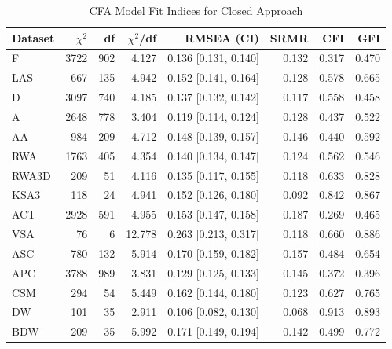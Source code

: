 \begin{table}[t]
\centering
\small
\caption{CFA Model Fit Indices for Closed Approach}
\label{tab:cfa-closed}
\begin{tabular}{lrrrrrrr}
\toprule
Dataset & $\chi^2$ & df & $\chi^2$/df & RMSEA (CI) & SRMR & CFI & GFI \\
\midrule
\rowcolor{Gray}F & 3722 & 902 & 4.127 & 0.136 [0.131, 0.140] & 0.132 & 0.317 & 0.470 \\
LAS & 667 & 135 & 4.942 & 0.152 [0.141, 0.164] & 0.128 & 0.578 & 0.665 \\
\rowcolor{Gray}D & 3097 & 740 & 4.185 & 0.137 [0.132, 0.142] & 0.117 & 0.558 & 0.458 \\
A & 2648 & 778 & 3.404 & 0.119 [0.114, 0.124] & 0.128 & 0.437 & 0.522 \\
\rowcolor{Gray}AA & 984 & 209 & 4.712 & 0.148 [0.139, 0.157] & 0.146 & 0.440 & 0.592 \\
RWA & 1763 & 405 & 4.354 & 0.140 [0.134, 0.147] & 0.124 & 0.562 & 0.546 \\
\rowcolor{Gray}RWA3D & 209 & 51 & 4.116 & 0.135 [0.117, 0.155] & 0.118 & 0.633 & 0.828 \\
KSA3 & 118 & 24 & 4.941 & 0.152 [0.126, 0.180] & 0.092 & 0.842 & 0.867 \\
\rowcolor{Gray}ACT & 2928 & 591 & 4.955 & 0.153 [0.147, 0.158] & 0.187 & 0.269 & 0.465 \\
VSA & 76 & 6 & 12.778 & 0.263 [0.213, 0.317] & 0.118 & 0.660 & 0.886 \\
\rowcolor{Gray}ASC & 780 & 132 & 5.914 & 0.170 [0.159, 0.182] & 0.157 & 0.484 & 0.654 \\
APC & 3788 & 989 & 3.831 & 0.129 [0.125, 0.133] & 0.145 & 0.372 & 0.396 \\
\rowcolor{Gray}CSM & 294 & 54 & 5.449 & 0.162 [0.144, 0.180] & 0.123 & 0.627 & 0.765 \\
DW & 101 & 35 & 2.911 & 0.106 [0.082, 0.130] & 0.068 & 0.913 & 0.893 \\
\rowcolor{Gray}BDW & 209 & 35 & 5.992 & 0.171 [0.149, 0.194] & 0.142 & 0.499 & 0.772 \\
\bottomrule
\end{tabular}
\end{table}